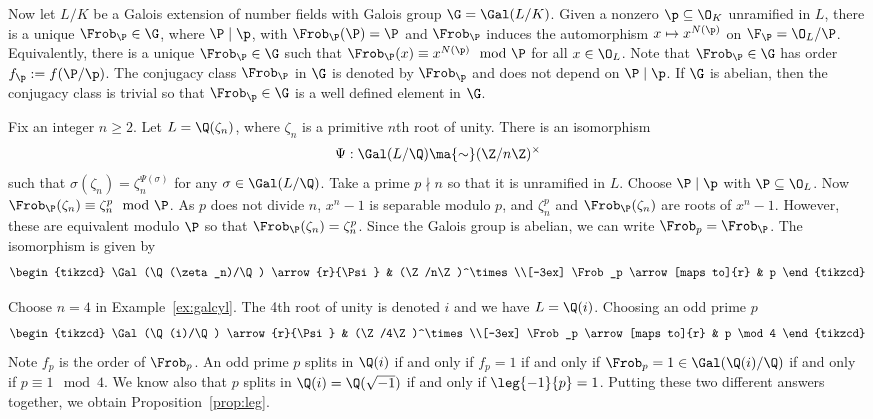 Now let $L/K$ be a Galois extension of number fields with Galois group $\G=\Gal(L/K)$. Given a nonzero $\p \subseteq \O_K$ unramified in $L$, there is a unique $\Frob_\P \in \G$, where $\P \mid \p$, with $\Frob_\P(\P)=\P$ and $\Frob_\P$ induces the automorphism $x \mapsto x^{N(\p)}$ on $\F_\P=\O_L/\P$. Equivalently, there is a unique $\Frob_\P \in \G$ such that $\Frob_\P(x) \equiv x^{N(\p)} \mod \P$ for all $x \in \O_L$. Note that $\Frob_\P \in \G$ has order $f_\p:=f(\P/\p)$. The conjugacy class $\Frob_\P$ in $\G$ is denoted by $\Frob_\p$ and does not depend on $\P\mid \p$. If $\G$ is abelian, then the conjugacy class is trivial so that $\Frob_\p \in \G$ is a well defined element in $\G$. 


\begin{ex}\label{ex:galcyl}
Fix an integer $n \geq 2$. Let $L=\Q(\zeta_n)$, where $\zeta_n$ is a primitive $n$th root of unity. There is an isomorphism
	\[
	\Psi: \Gal(L/\Q) \ma{\sim} (\Z/n\Z)^\times
	\]
such that $\sigma(\zeta_n)=\zeta_n^{\Psi(\sigma)}$ for any $\sigma \in \Gal(L/\Q)$. Take a prime $p \nmid n$ so that it is unramified in $L$. Choose $\P \mid \p$ with $\P \subseteq \O_L$. Now $\Frob_\P(\zeta_n) \equiv \zeta_n^p \mod \P$. As $p$ does not divide $n$, $x^n-1$ is separable modulo $p$, and $\zeta_n^p$ and $\Frob_\P(\zeta_n)$ are roots of $x^n-1$. However, these are equivalent modulo $\P$ so that $\Frob_\P(\zeta_n)=\zeta_n^p$. Since the Galois group is abelian, we can write $\Frob_p=\Frob_\P$. The isomorphism is given by
	\[
	\begin{tikzcd}
	\Gal(\Q(\zeta_n)/\Q) \arrow{r}{\Psi} & (\Z/n\Z)^\times \\[-3ex]
	\Frob_p \arrow[maps to]{r} & p
	\end{tikzcd}
	\] \xqed
\end{ex}


\begin{ex}\label{ex:parta}
Choose $n=4$ in Example~\ref{ex:galcyl}. The 4th root of unity is denoted $i$ and we have $L=\Q(i)$. Choosing an odd prime $p$
	\[
	\begin{tikzcd}
	\Gal(\Q(i)/\Q) \arrow{r}{\Psi} & (\Z/4\Z)^\times \\[-3ex]
	\Frob_p \arrow[maps to]{r} & p \mod 4
	\end{tikzcd}
	\]
Note $f_p$ is the order of $\Frob_p$. An odd prime $p$ splits in $\Q(i)$ if and only if $f_p=1$ if and only if $\Frob_p=1 \in \Gal(\Q(i)/\Q)$ if and only if $p \equiv 1 \mod 4$. We know also that $p$ splits in $\Q(i)=\Q(\sqrt{-1})$ if and only if $\leg{-1}{p}=1$. Putting these two different answers together, we obtain Proposition~\ref{prop:leg}. \xqed
\end{ex}


